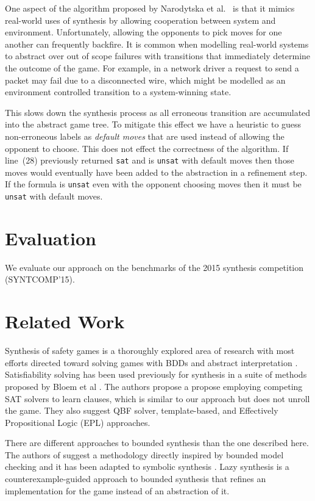 \documentclass{llncs}
\begin{document}
One aspect of the algorithm proposed by Narodytska et al.~\cite{narodytska2014}
is that it mimics real-world uses of synthesis by allowing cooperation between
system and environment. Unfortunately, allowing the opponents to pick moves for
one another can frequently backfire. It is common when modelling real-world
systems to abstract over out of scope failures with transitions that
immediately determine the outcome of the game. For example, in a network driver
a request to send a packet may fail due to a disconnected wire, which might be
modelled as an environment controlled transition to a system-winning state.

This slows down the synthesis process as all erroneous transition are
accumulated into the abstract game tree. To mitigate this effect we have a
heuristic to guess non-erroneous labels as \emph{default moves} that are used
instead of allowing the opponent to choose. This does not effect the
correctness of the algorithm. If line~(28) previously returned \texttt{sat} and
is \texttt{unsat} with default moves then those moves would eventually have
been added to the abstraction in a refinement step. If the formula is
\texttt{unsat} even with the opponent choosing moves then it must be
\texttt{unsat} with default moves.

\section{Evaluation}

We evaluate our approach on the benchmarks of the 2015 synthesis competition
(SYNTCOMP'15). 

\section{Related Work}

Synthesis of safety games is a thoroughly explored area of research with most
efforts directed toward solving games with BDDs \cite{burch1990} and abstract
interpretation \cite{walker2014,brenguier2014}. Satisfiability solving has been used
previously for synthesis in a suite of methods proposed by Bloem et al
\cite{bloem2014}. The authors propose a propose employing competing SAT solvers
to learn clauses, which is similar to our approach but does not unroll the
game. They also suggest QBF solver, template-based, and Effectively
Propositional Logic (EPL) approaches.

There are different approaches to bounded synthesis than the one described
here. The authors of \cite{finkbeiner2013} suggest a methodology directly
inspired by bounded model checking and it has been adapted to symbolic
synthesis \cite{ehlers2010}. Lazy synthesis \cite{finkbeiner2012} is a
counterexample-guided approach to bounded synthesis that refines an
implementation for the game instead of an abstraction of it.
\end{document}
